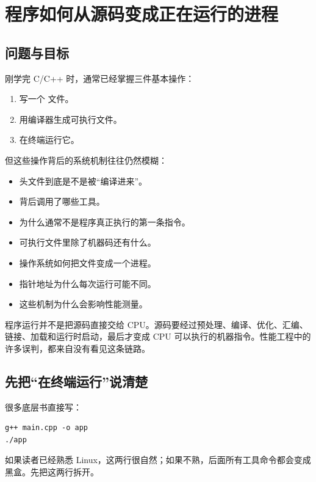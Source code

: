 \chapter{程序如何从源码变成正在运行的进程}

\section{问题与目标}

刚学完 C/C++ 时，通常已经掌握三件基本操作：

\begin{enumerate}
  \item 写一个  文件。
  \item 用编译器生成可执行文件。
  \item 在终端运行它。
\end{enumerate}

但这些操作背后的系统机制往往仍然模糊：

\begin{itemize}
  \item 头文件到底是不是被“编译进来”。
  \item {} 背后调用了哪些工具。
  \item {} 为什么通常不是程序真正执行的第一条指令。
  \item 可执行文件里除了机器码还有什么。
  \item 操作系统如何把文件变成一个进程。
  \item 指针地址为什么每次运行可能不同。
  \item 这些机制为什么会影响性能测量。
\end{itemize}

\begin{keyidea}
程序运行并不是把源码直接交给 CPU。源码要经过预处理、编译、优化、汇编、链接、加载和运行时启动，最后才变成 CPU 可以执行的机器指令。性能工程中的许多误判，都来自没有看见这条链路。
\end{keyidea}

\section{先把“在终端运行”说清楚}

很多底层书直接写：

\begin{lstlisting}[numbers=none]
g++ main.cpp -o app
./app
\end{lstlisting}

如果读者已经熟悉 Linux，这两行很自然；如果不熟，后面所有工具命令都会变成黑盒。先把这两行拆开。

